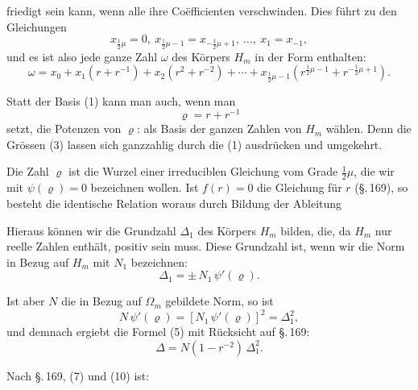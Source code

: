 friedigt sein kann, wenn alle ihre Co\"efficienten verschwinden. Dies f\"uhrt zu den Gleichungen
\[
x_{\frac12\mu}=0,\ x_{\frac12\mu-1}=x_{-\frac12\mu+1},\ \dots,\ x_1=x_{-1},
\]
und es ist also jede ganze Zahl $\omega$ des K\"orpers $H_m$ in der Form enthalten:
\[
\omega = x_0+x_1(r+r^{-1})+x_2(r^2+r^{-2})+\cdots
+x_{\frac12\mu-1}(r^{\frac12\mu-1}+r^{-\frac12\mu+1}).
\]

Statt der Basis (1) kann man auch, wenn man
\[
\varrho = r+r^{-1}
\]
setzt, die Potenzen von $\varrho$:
als Basis der ganzen Zahlen von $H_m$ w\"ahlen. Denn die Gr\"ossen (3) lassen sich ganzzahlig durch die (1) ausdr\"ucken und umgekehrt.

Die Zahl $\varrho$ ist die Wurzel einer irreduciblen Gleichung vom Grade $\frac12\mu$, die wir mit $\psi(\varrho)=0$ bezeichnen wollen. Ist $f(r)=0$ die Gleichung f\"ur $r$ (\S.\,169), so besteht die identische Relation
woraus durch Bildung der Ableitung

Hieraus k\"onnen wir die Grundzahl $\Delta_1$ des K\"orpers $H_m$ bilden, die, da $H_m$ nur reelle Zahlen enth\"alt, positiv sein muss. Diese Grundzahl ist, wenn wir die Norm in Bezug auf $H_m$ mit $N_1$ bezeichnen:
\[
\Delta_1 = \pm\,N_1\,\psi'(\varrho).
\]

Ist aber $N$ die in Bezug auf $\Omega_m$ gebildete Norm, so ist
\[
N\,\psi'(\varrho) = [N_1\,\psi'(\varrho)]^2 = \Delta_1^2,
\]
und demnach ergiebt die Formel (5) mit R\"ucksicht auf \S.\,169:
\[
\Delta = N(1-r^{-2})\,\Delta_1^2.
\]

Nach \S.\,169, (7) und (10) ist:

